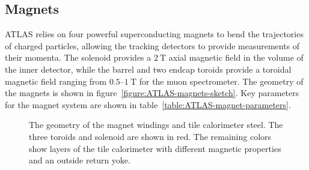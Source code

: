 \subsection{Magnets}\label{sec:ATLAS-magnets}
ATLAS relies on four powerful superconducting magnets to bend the trajectories of charged particles, allowing the tracking detectors to provide measurements of their momenta. The solenoid provides a $2~\mbox{T}$ axial magnetic field in the volume of the inner detector, while the barrel and two endcap toroids provide a toroidal magnetic field ranging from $0.5$--$1~\mbox{T}$ for the muon spectrometer. The geometry of the magnets is shown in figure~\ref{figure:ATLAS-magnets-sketch}. Key parameters for the magnet system are shown in table~\ref{table:ATLAS-magnet-parameters}.

\begin{figure}[htbp]
	\centering
	\caption{The geometry of the magnet windings and tile calorimeter steel. The three toroids and solenoid are shown in red. The remaining colors show layers of the tile calorimeter with different magnetic properties and an outside return yoke.}
	\label{fig:ATLAS-magnets-sketch}
\end{figure}


